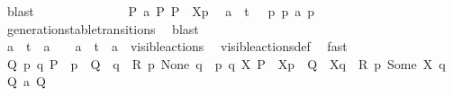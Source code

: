 \begin{isabellebody}
\ blast\isanewline
\ \ \ \ \ \ \isanewline
\ \ \ \ \ \ \isamarkupfalse%
\ {\isacartoucheopen}P\ {\isasymlongmapsto}\isactrlsup {\isasymtheta}a\ P{\isacharprime}{\kern0pt}{\isacartoucheclose}\ {\isacartoucheopen}P\ {\isacharequal}{\kern0pt}\ {\isasymtheta}{\isacharbrackleft}{\kern0pt}X{\isacharbrackright}{\kern0pt}{\isacharparenleft}{\kern0pt}p{\isacharparenright}{\kern0pt}{\isacartoucheclose}\ \isamarkupfalse%
\ {\isacartoucheopen}a\ {\isacharequal}{\kern0pt}\ t{\isacharunderscore}{\kern0pt}{\isasymepsilon}\ {\isasymor}\ {\isacharparenleft}{\kern0pt}{\isasymexists}\ p{\isacharprime}{\kern0pt}{\isachardot}{\kern0pt}\ p\ {\isasymlongmapsto}a\ p{\isacharprime}{\kern0pt}{\isacharparenright}{\kern0pt}{\isacartoucheclose}\isanewline
\ \ \ \ \ \ \ \ \isamarkupfalse%
\ generation{\isacharunderscore}{\kern0pt}stable{\isacharunderscore}{\kern0pt}transitions\ \isamarkupfalse%
\ blast\isanewline
\ \ \ \ \isanewline
\ \ \ \ \ \ \isamarkupfalse%
\ {\isacartoucheopen}a\ {\isacharequal}{\kern0pt}\ t{\isacharunderscore}{\kern0pt}{\isasymepsilon}\ {\isasymor}\ a\ {\isacharequal}{\kern0pt}\ {\isasymtau}\ {\isasymor}\ a\ {\isacharequal}{\kern0pt}\ t\ {\isasymor}\ a\ {\isasymin}\ visible{\isacharunderscore}{\kern0pt}actions{\isacartoucheclose}\ \isamarkupfalse%
\ visible{\isacharunderscore}{\kern0pt}actions{\isacharunderscore}{\kern0pt}def\ \isamarkupfalse%
\ fast\isanewline
\ \ \ \ \ \ \isamarkupfalse%
\ {\isacartoucheopen}{\isasymexists}Q{\isacharprime}{\kern0pt}{\isachardot}{\kern0pt}\ {\isacharparenleft}{\kern0pt}{\isacharparenleft}{\kern0pt}{\isasymexists}p\ q{\isachardot}{\kern0pt}\ P{\isacharprime}{\kern0pt}\ {\isacharequal}{\kern0pt}\ {\isasymtheta}{\isacharparenleft}{\kern0pt}p{\isacharparenright}{\kern0pt}\ {\isasymand}\ Q{\isacharprime}{\kern0pt}\ {\isacharequal}{\kern0pt}\ {\isasymtheta}{\isacharparenleft}{\kern0pt}q{\isacharparenright}{\kern0pt}\ {\isasymand}\ R\ p\ None\ q{\isacharparenright}{\kern0pt}\ {\isasymor}\ {\isacharparenleft}{\kern0pt}{\isasymexists}p\ q\ X{\isachardot}{\kern0pt}\ P{\isacharprime}{\kern0pt}\ {\isacharequal}{\kern0pt}\ {\isasymtheta}{\isacharbrackleft}{\kern0pt}X{\isacharbrackright}{\kern0pt}{\isacharparenleft}{\kern0pt}p{\isacharparenright}{\kern0pt}\ {\isasymand}\ Q{\isacharprime}{\kern0pt}\ {\isacharequal}{\kern0pt}\ {\isasymtheta}{\isacharbrackleft}{\kern0pt}X{\isacharbrackright}{\kern0pt}{\isacharparenleft}{\kern0pt}q{\isacharparenright}{\kern0pt}\ {\isasymand}\ R\ p\ {\isacharparenleft}{\kern0pt}Some\ X{\isacharparenright}{\kern0pt}\ q{\isacharparenright}{\kern0pt}{\isacharparenright}{\kern0pt}\ {\isasymand}\ Q\ {\isasymlongmapsto}\isactrlsup {\isasymtheta}a\ Q{\isacharprime}{\kern0pt}{\isacartoucheclose}\isanewline

\end{isabellebody}
